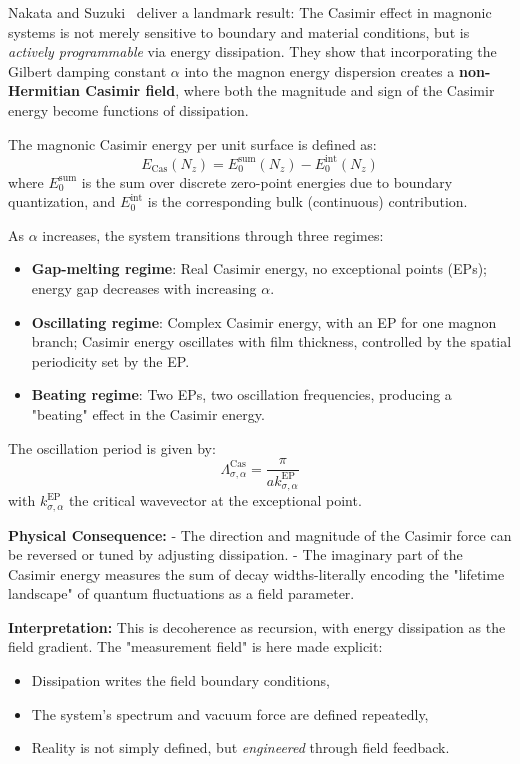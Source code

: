 Nakata and Suzuki~\cite{nakata_non-hermitian_2024} deliver a landmark result:  
The Casimir effect in magnonic systems is not merely sensitive to boundary and material conditions, but is \emph{actively programmable} via energy dissipation. They show that incorporating the Gilbert damping constant $\alpha$ into the magnon energy dispersion creates a \textbf{non-Hermitian Casimir field}, where both the magnitude and sign of the Casimir energy become functions of dissipation.

The magnonic Casimir energy per unit surface is defined as:
\begin{equation}
E_\text{Cas}(N_z) = E^{\text{sum}}_0(N_z) - E^{\text{int}}_0(N_z)
\end{equation}
where $E^{\text{sum}}_0$ is the sum over discrete zero-point energies due to boundary quantization, and $E^{\text{int}}_0$ is the corresponding bulk (continuous) contribution.

As $\alpha$ increases, the system transitions through three regimes:

\begin{itemize}
    \item \textbf{Gap-melting regime}: Real Casimir energy, no exceptional points (EPs); energy gap decreases with increasing $\alpha$.
    \item \textbf{Oscillating regime}: Complex Casimir energy, with an EP for one magnon branch; Casimir energy oscillates with film thickness, controlled by the spatial periodicity set by the EP.
    \item \textbf{Beating regime}: Two EPs, two oscillation frequencies, producing a "beating" effect in the Casimir energy.
\end{itemize}

The oscillation period is given by:
\begin{equation}
\Lambda^\text{Cas}_{\sigma,\alpha} = \frac{\pi}{a k^{\text{EP}}_{\sigma,\alpha}}
\end{equation}
with $k^{\text{EP}}_{\sigma,\alpha}$ the critical wavevector at the exceptional point.

\textbf{Physical Consequence:}  
- The direction and magnitude of the Casimir force can be reversed or tuned by adjusting dissipation.  
- The imaginary part of the Casimir energy measures the sum of decay widths-literally encoding the "lifetime landscape" of quantum fluctuations as a field parameter.

\textbf{Interpretation:}  
This is decoherence as recursion, with energy dissipation as the field gradient. The "measurement field" is here made explicit:  
\begin{itemize}
    \item Dissipation writes the field boundary conditions,
    \item The system's spectrum and vacuum force are defined repeatedly,
    \item Reality is not simply defined, but \emph{engineered} through field feedback.
\end{itemize}

